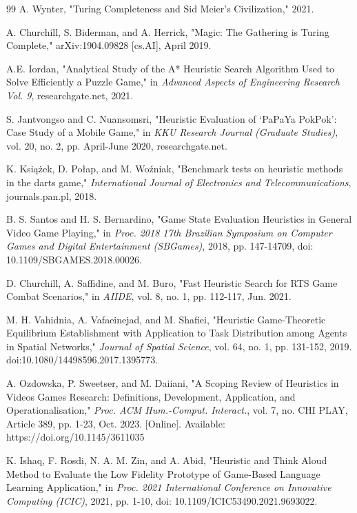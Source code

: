 \documentclass{telkomnika}
\begin{document}
\begin{thebibliography} {99}
A. Wynter, "Turing Completeness and Sid Meier's Civilization," 2021.

A. Churchill, S. Biderman, and A. Herrick, "Magic: The Gathering is Turing Complete," arXiv:1904.09828 [cs.AI], April 2019.

A.E. Iordan, "Analytical Study of the A* Heuristic Search Algorithm Used to Solve Efficiently a Puzzle Game," in \textit{Advanced Aspects of Engineering Research Vol. 9}, researchgate.net, 2021.

S. Jantvongso and C. Nuansomsri, "Heuristic Evaluation of ‘PaPaYa PokPok’: Case Study of a Mobile Game," in \textit{KKU Research Journal (Graduate Studies)}, vol. 20, no. 2, pp. April-June 2020, researchgate.net.

K. Książek, D. Połap, and M. Woźniak, "Benchmark tests on heuristic methods in the darts game," \textit{International Journal of Electronics and Telecommunications}, journals.pan.pl, 2018.

B. S. Santos and H. S. Bernardino, "Game State Evaluation Heuristics in General Video Game Playing," in \textit{Proc. 2018 17th Brazilian Symposium on Computer Games and Digital Entertainment (SBGames)}, 2018, pp. 147-14709, doi: 10.1109/SBGAMES.2018.00026.

D. Churchill, A. Saffidine, and M. Buro, "Fast Heuristic Search for RTS Game Combat Scenarios," in \textit{AIIDE}, vol. 8, no. 1, pp. 112-117, Jun. 2021.

M. H. Vahidnia, A. Vafaeinejad, and M. Shafiei, "Heuristic Game-Theoretic Equilibrium Establishment with Application to Task Distribution among Agents in Spatial Networks," \textit{Journal of Spatial Science}, vol. 64, no. 1, pp. 131-152, 2019. doi:10.1080/14498596.2017.1395773.

A. Ozdowska, P. Sweetser, and M. Daiiani, "A Scoping Review of Heuristics in Videos Games Research: Definitions, Development, Application, and Operationalisation," \textit{Proc. ACM Hum.-Comput. Interact.}, vol. 7, no. CHI PLAY, Article 389, pp. 1-23, Oct. 2023. [Online]. Available: https://doi.org/10.1145/3611035

K. Ishaq, F. Rosdi, N. A. M. Zin, and A. Abid, "Heuristic and Think Aloud Method to Evaluate the Low Fidelity Prototype of Game-Based Language Learning Application," in \textit{Proc. 2021 International Conference on Innovative Computing (ICIC)}, 2021, pp. 1-10, doi: 10.1109/ICIC53490.2021.9693022.


\end{thebibliography}
\end{document}
